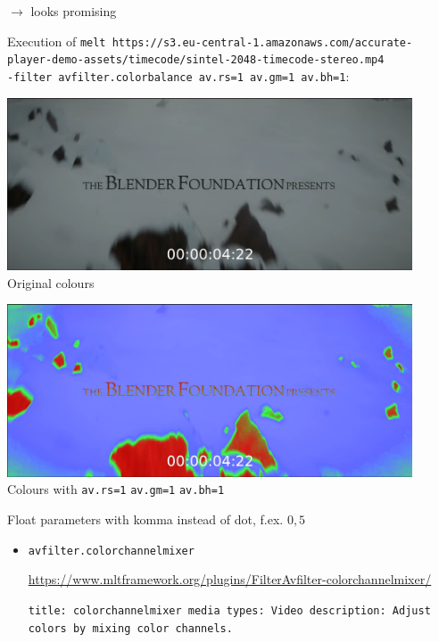 \documentclass[12pt,a4paper]{article}
\begin{document}
\begin{itemize}
		$\rightarrow$ looks promising
		
		
		Execution of \texttt{melt https://s3.eu-central-1.amazonaws.com/accurate-player\--demo-assets/timecode/sintel-2048-timecode-stereo.mp4 \\ -filter avfilter.colorbalance av.rs=1 av.gm=1 av.bh=1}:
		
		
		\begin{minipage}{0.5\textwidth}
			\includegraphics[width=0.9\textwidth]{colourdefault.png}
			Original colours
		\end{minipage}\begin{minipage}{0.5\textwidth}
			\includegraphics[width=0.9\textwidth]{colourhigh.png}
			Colours with \texttt{av.rs=1} \texttt{av.gm=1} \texttt{av.bh=1}
		\end{minipage}
		
		Float parameters with komma instead of dot, f.ex. $0,5$
		

	
		\newpage
		
		\begin{itemize}	
		
		\item \texttt{avfilter.colorchannelmixer}
		
		\url{https://www.mltframework.org/plugins/FilterAvfilter-colorchannelmixer/}
		
		\texttt{title: colorchannelmixer \newline
			media types: Video \newline
			description: Adjust colors by mixing color channels.}
		

\end{itemize}
\end{itemize}
\end{document}
